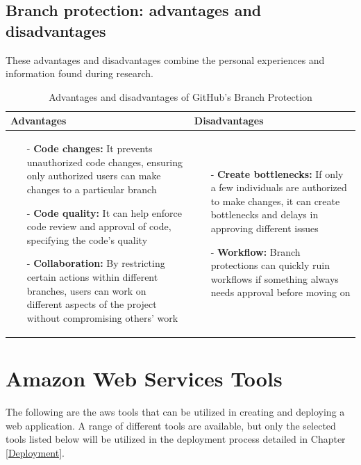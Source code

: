 \subsection{Branch protection: advantages and disadvantages}
These advantages and disadvantages combine the personal experiences and information found during research. 
\begin{table}[H]
\centering
\begin{tabular}{|>{\raggedright\arraybackslash}p{6cm}|>{\raggedright\arraybackslash}p{6cm}|}
\hline
\textbf{Advantages} & \textbf{Disadvantages} \\
\hline
\begin{itemize}
\item [-] \textbf{Code changes:} It prevents unauthorized code changes, ensuring only authorized users can make changes to a particular branch
\vspace{5pt}
\item [-]\textbf{Code quality:} It can help enforce code review and approval of code, specifying the code's quality 
\vspace{5pt}
\item [-] \textbf{Collaboration:} By restricting certain actions within different branches, users can work on different aspects of the project without compromising others' work 
\end{itemize}
&
   \begin{itemize}
\item [-] \textbf{Create bottlenecks:} If only a few individuals are authorized to make changes, it can create bottlenecks and delays in approving different issues 
\vspace{5pt}
\item [-] \textbf{Workflow:} Branch protections can quickly ruin workflows if something always needs approval before moving on 
    \end{itemize}
    \\
    \hline
    \end{tabular}
    \caption{Advantages and disadvantages of GitHub's Branch Protection}
    \label{tab: Branch_protection}
    \end{table}
    


\section{Amazon Web Services Tools}

The following are the \acrshort{aws} tools that can be utilized in creating and deploying a web application. A range of different tools are available, but only the selected tools listed below will be utilized in the deployment process detailed in Chapter \ref{Deployment}.

